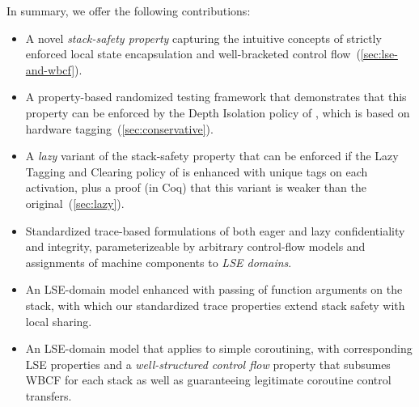 \documentclass[acmsmall,review,anonymous]{acmart}\settopmatter{printfolios=true,printccs=false,printacmref=false}
\begin{document}
In summary, we offer the following contributions:
\begin{itemize}
\item
  A novel {\em stack-safety property} capturing the intuitive concepts of strictly enforced
  local state encapsulation and well-bracketed control flow~(\cref{sec:lse-and-wbcf}).
\item
  A property-based randomized testing framework that demonstrates that this
  property can be enforced by the Depth Isolation policy of
  \citet{DBLP:conf/sp/RoesslerD18}, which is based on hardware
  tagging~(\cref{sec:conservative}).
\item
  A {\em lazy} variant of the stack-safety property that can be enforced if the
  Lazy Tagging and Clearing policy of \citet{DBLP:conf/sp/RoesslerD18} is enhanced
  with unique tags on each activation, plus a proof (in Coq) that this
  variant is weaker than the original~(\cref{sec:lazy}).
\item
  Standardized trace-based formulations of both eager and lazy confidentiality and integrity,
  parameterizeable by arbitrary control-flow models and assignments of machine components
  to {\em LSE domains}.
\item
  An LSE-domain model enhanced with passing of function arguments on the stack, with which our
  standardized trace properties extend stack safety with local sharing.
\item
  An LSE-domain model that applies to simple coroutining, with corresponding LSE
  properties and a {\em well-structured control flow} property that subsumes WBCF for each
  stack as well as guaranteeing legitimate coroutine control transfers.
%


\end{itemize}
\end{document}
